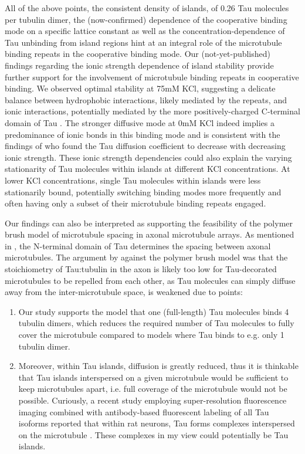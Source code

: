 All of the above points, the consistent density of islands, of 0.26 Tau molecules per tubulin dimer, the (now-confirmed) dependence of the cooperative binding mode on a specific lattice constant \parencite{siahaan2022microtubule} as well as the concentration-dependence of Tau unbinding from island regions hint at an integral role of the microtubule binding repeats in the cooperative binding mode. Our (not-yet-published) findings regarding the ionic strength dependence of island stability  provide further support for the involvement of microtubule binding repeats in cooperative binding. We observed optimal stability at 75mM KCl, suggesting a delicate balance between hydrophobic interactions, likely mediated by the repeats, and ionic interactions, potentially mediated by the more positively-charged C-terminal domain of Tau . The stronger diffusive mode at 0mM KCl indeed implies a predominance of ionic bonds in this binding mode and is consistent with the findings of \cite{Hinrichs2012b} who found the Tau diffusion coefficient to decrease with decreasing ionic strength. These ionic strength dependencies could also explain the varying stationarity of Tau molecules within islands at different KCl concentrations. At lower KCl concentrations, single Tau molecules within islands were less stationarily bound, potentially switching binding modes more frequently and often having only a subset of their microtubule binding repeats engaged.\par

Our findings can also be interpreted as supporting the feasibility of the polymer brush model of microtubule spacing in axonal microtubule arrays. As mentioned in , the N-terminal domain of Tau determines the spacing between axonal microtubules. The argument by \cite{Gaspard} against the polymer brush model was that the stoichiometry of Tau:tubulin in the axon is likely too low for Tau-decorated microtubules to be repelled from each other, as Tau molecules can simply diffuse away from the inter-microtubule space, is weakened due to points:
\begin{enumerate}
    \item Our study supports the model that one (full-length) Tau molecules binds 4 tubulin dimers, which reduces the required number of Tau molecules to fully cover the microtubule compared to models where Tau binds to e.g. only 1 tubulin dimer.
    \item Moreover, within Tau islands, diffusion is greatly reduced, thus it is thinkable that Tau islands interspersed on a given microtubule would be sufficient to keep microtubules apart, i.e. full coverage of the microtubule would not be possible. Curiously, a recent study employing super-resolution fluorescence imaging combined with antibody-based fluorescent labeling of all Tau isoforms reported that within rat neurons, Tau forms complexes interspersed on the microtubule . These complexes in my view could potentially be Tau islands.
\end{enumerate}

